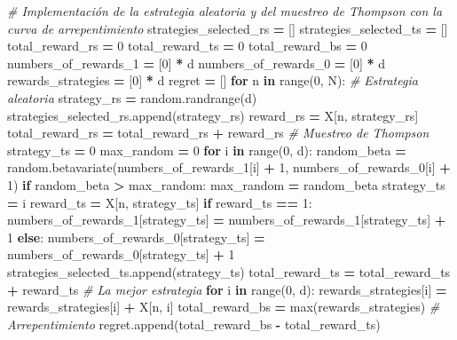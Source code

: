 \documentclass[]{book}
\newenvironment{Shaded}{\begin{snugshade}}{\end{snugshade}}
\newcommand{\BuiltInTok}[1]{#1}
\newcommand{\CommentTok}[1]{\textcolor[rgb]{0.56,0.35,0.01}{\textit{#1}}}
\newcommand{\ControlFlowTok}[1]{\textcolor[rgb]{0.13,0.29,0.53}{\textbf{#1}}}
\newcommand{\DecValTok}[1]{\textcolor[rgb]{0.00,0.00,0.81}{#1}}
\newcommand{\KeywordTok}[1]{\textcolor[rgb]{0.13,0.29,0.53}{\textbf{#1}}}
\newcommand{\NormalTok}[1]{#1}
\newcommand{\OperatorTok}[1]{\textcolor[rgb]{0.81,0.36,0.00}{\textbf{#1}}}
\begin{document}
\begin{Shaded}
\begin{Highlighting}[]
\CommentTok{# Implementación de la estrategia aleatoria y del muestreo de Thompson con la curva de arrepentimiento}
\NormalTok{strategies_selected_rs }\OperatorTok{=}\NormalTok{ []}
\NormalTok{strategies_selected_ts }\OperatorTok{=}\NormalTok{ []}
\NormalTok{total_reward_rs }\OperatorTok{=} \DecValTok{0}
\NormalTok{total_reward_ts }\OperatorTok{=} \DecValTok{0}
\NormalTok{total_reward_bs }\OperatorTok{=} \DecValTok{0}
\NormalTok{numbers_of_rewards_1 }\OperatorTok{=}\NormalTok{ [}\DecValTok{0}\NormalTok{] }\OperatorTok{*}\NormalTok{ d}
\NormalTok{numbers_of_rewards_0 }\OperatorTok{=}\NormalTok{ [}\DecValTok{0}\NormalTok{] }\OperatorTok{*}\NormalTok{ d}
\NormalTok{rewards_strategies }\OperatorTok{=}\NormalTok{ [}\DecValTok{0}\NormalTok{] }\OperatorTok{*}\NormalTok{ d}
\NormalTok{regret }\OperatorTok{=}\NormalTok{ []}
\ControlFlowTok{for}\NormalTok{ n }\KeywordTok{in} \BuiltInTok{range}\NormalTok{(}\DecValTok{0}\NormalTok{, N):}
    \CommentTok{# Estrategia aleatoria}
\NormalTok{    strategy_rs }\OperatorTok{=}\NormalTok{ random.randrange(d)}
\NormalTok{    strategies_selected_rs.append(strategy_rs)}
\NormalTok{    reward_rs }\OperatorTok{=}\NormalTok{ X[n, strategy_rs]}
\NormalTok{    total_reward_rs }\OperatorTok{=}\NormalTok{ total_reward_rs }\OperatorTok{+}\NormalTok{ reward_rs}
    \CommentTok{# Muestreo de Thompson}
\NormalTok{    strategy_ts }\OperatorTok{=} \DecValTok{0}
\NormalTok{    max_random }\OperatorTok{=} \DecValTok{0}
    \ControlFlowTok{for}\NormalTok{ i }\KeywordTok{in} \BuiltInTok{range}\NormalTok{(}\DecValTok{0}\NormalTok{, d):}
\NormalTok{        random_beta }\OperatorTok{=}\NormalTok{ random.betavariate(numbers_of_rewards_1[i] }\OperatorTok{+} \DecValTok{1}\NormalTok{,}
\NormalTok{                                         numbers_of_rewards_0[i] }\OperatorTok{+} \DecValTok{1}\NormalTok{)}
        \ControlFlowTok{if}\NormalTok{ random_beta }\OperatorTok{>}\NormalTok{ max_random:}
\NormalTok{            max_random }\OperatorTok{=}\NormalTok{ random_beta}
\NormalTok{            strategy_ts }\OperatorTok{=}\NormalTok{ i}
\NormalTok{    reward_ts }\OperatorTok{=}\NormalTok{ X[n, strategy_ts]}
    \ControlFlowTok{if}\NormalTok{ reward_ts }\OperatorTok{==} \DecValTok{1}\NormalTok{:}
\NormalTok{        numbers_of_rewards_1[strategy_ts] }\OperatorTok{=}\NormalTok{ numbers_of_rewards_1[strategy_ts] }\OperatorTok{+} \DecValTok{1}
    \ControlFlowTok{else}\NormalTok{:}
\NormalTok{        numbers_of_rewards_0[strategy_ts] }\OperatorTok{=}\NormalTok{ numbers_of_rewards_0[strategy_ts] }\OperatorTok{+} \DecValTok{1}
\NormalTok{    strategies_selected_ts.append(strategy_ts)}
\NormalTok{    total_reward_ts }\OperatorTok{=}\NormalTok{ total_reward_ts }\OperatorTok{+}\NormalTok{ reward_ts}
    \CommentTok{# La mejor estrategia}
    \ControlFlowTok{for}\NormalTok{ i }\KeywordTok{in} \BuiltInTok{range}\NormalTok{(}\DecValTok{0}\NormalTok{, d):}
\NormalTok{        rewards_strategies[i] }\OperatorTok{=}\NormalTok{ rewards_strategies[i] }\OperatorTok{+}\NormalTok{ X[n, i]}
\NormalTok{    total_reward_bs }\OperatorTok{=} \BuiltInTok{max}\NormalTok{(rewards_strategies)}
    \CommentTok{# Arrepentimiento}
\NormalTok{    regret.append(total_reward_bs }\OperatorTok{-}\NormalTok{ total_reward_ts)}


\end{Highlighting}
\end{Shaded}
\end{document}
